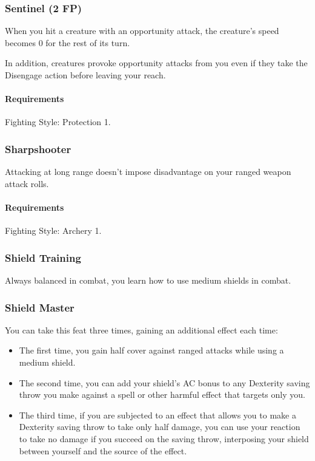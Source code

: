 \subsubsection{Sentinel (2 FP)} \label{feat::sentinel}
    When you hit a creature with an opportunity attack, the creature's speed becomes 0 for the rest of its turn.

    In addition, creatures provoke opportunity attacks from you even if they take the Disengage action before leaving your reach.
    \paragraph{Requirements} Fighting Style: Protection 1.
\subsubsection{Sharpshooter} \label{feat::sharpshooter}
    Attacking at long range doesn't impose disadvantage on your ranged weapon attack rolls.
    \paragraph{Requirements} Fighting Style: Archery 1.
\subsubsection{Shield Training} \label{feat::shieldtraining}
    Always balanced in combat, you learn how to use medium shields in combat.
\subsubsection{Shield Master} \label{feat::shieldmaster}
    You can take this feat three times, gaining an additional effect each time:
    \begin{itemize}
        \item The first time, you gain half cover against ranged attacks while using a medium shield.
        \item The second time, you can add your shield's AC bonus to any Dexterity saving throw you make against a spell or other harmful effect that targets only you.
        \item The third time, if you are subjected to an effect that allows you to make a Dexterity saving throw to take only half damage, you can use your reaction to take no damage if you succeed on the saving throw, interposing your shield between yourself and the source of the effect.
    \end{itemize}
